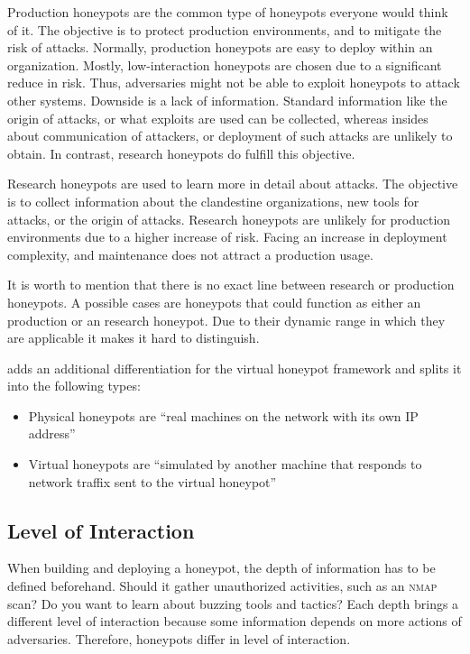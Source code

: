Production honeypots are the common type of honeypots everyone would think of it.
The objective is to protect production environments, and to mitigate the risk of attacks.
Normally, production honeypots are easy to deploy within an organization.
Mostly, low-interaction honeypots are chosen due to a significant reduce in risk.
Thus, adversaries might not be able to exploit honeypots to attack other systems.
Downside is a lack of information. Standard information like the origin of attacks, or what exploits are used can be collected, whereas insides about communication of attackers, or deployment of such attacks are unlikely to obtain.
In contrast, research honeypots do fulfill this objective.\cite{Spitzner2003}

Research honeypots are used to learn more in detail about attacks.
The objective is to collect information about the clandestine organizations, new tools for attacks, or the origin of attacks.
Research honeypots are unlikely for production environments due to a higher increase of risk.
Facing an increase in deployment complexity, and maintenance does not attract a production usage.\cite{Spitzner2003}

It is worth to mention that there is no exact line between research or production honeypots.
A possible cases are honeypots that could function as either an production or an research honeypot.
Due to their dynamic range in which they are applicable it makes it hard to distinguish.

\citet{Provos2003} adds an additional differentiation for the virtual honeypot framework and splits it into the following types:

\begin{itemize}
    \item Physical honeypots are \enquote{real machines on the network with its own IP address} \cite{Provos2003}
    \item Virtual honeypots are \enquote{simulated by another machine that responds to network traffix sent to the virtual honeypot} \cite{Provos2003}
\end{itemize}

\subsection{Level of Interaction}
\label{subsec:interaction-honeypots}

When building and deploying a honeypot, the depth of information has to be defined beforehand.
Should it gather unauthorized activities, such as an \textsc{nmap} scan?
Do you want to learn about buzzing tools and tactics?
Each depth brings a different level of interaction because some information depends on more actions of adversaries.
Therefore, honeypots differ in level of interaction.

